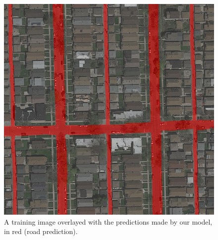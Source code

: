 \documentclass[10pt,conference,compsocconf]{IEEEtran}
\begin{document}
\begin{figure}[h]
	\centering
	\includegraphics[scale=0.35]{prediction.jpeg}
	\captionsetup{justification=centering, margin=0.2cm}
	\caption{A training image overlayed with the predictions made by our model, in red (road prediction).}
	\vspace{-4mm}
	\label{fig:comp}
\end{figure}



\end{document}
